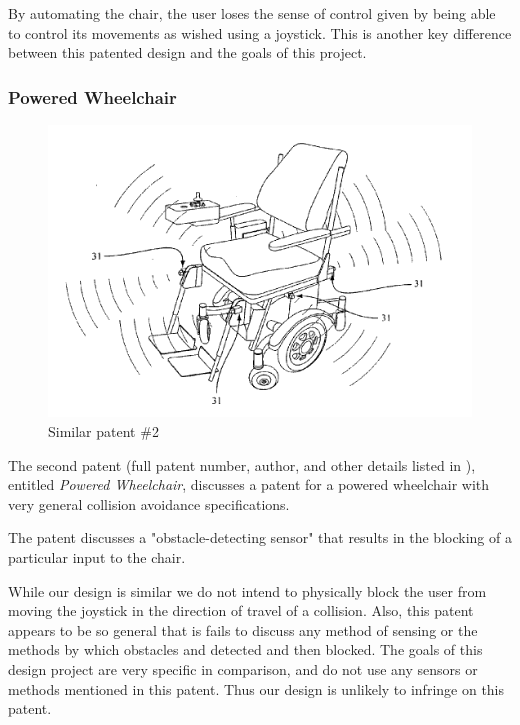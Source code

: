 \documentclass[oneside,final,a4paper]{report}
\begin{document}
By automating the chair, the user loses the sense of control given by being able to control its movements as wished using a joystick. This is another key difference between this patented design and the goals of this project.

\subsubsection{Powered Wheelchair}
\begin{figure}[hbt]
 \centering
 \includegraphics[scale=0.4]{patents2}
 \caption{Similar patent \#2 \cite{patent:power_wheelchair}}
\end{figure}

The second patent (full patent number, author, and other details listed in \cite{patent:power_wheelchair}), entitled \emph{Powered Wheelchair}, discusses a patent for a powered wheelchair with very general collision avoidance specifications.

The patent discusses a "obstacle-detecting sensor" that results in the blocking of a particular input to the chair.

While our design is similar we do not intend to physically block the user from moving the joystick in the direction of travel of a collision. Also, this patent appears to be so general that is fails to discuss any method of sensing or the methods by which obstacles and detected and then blocked. The goals of this design project are very specific in comparison, and do not use any sensors or methods mentioned in this patent. Thus our design is unlikely to infringe on this patent.
\end{document}
